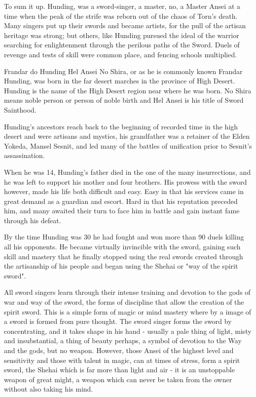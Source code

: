 To sum it up. Hunding, was a sword-singer, a master, no, a Master Ansei at a time when the peak of the strife was reborn out of the chaos of Torn's death. Many singers put up their swords and became artists, for the pull of the artisan heritage was strong; but others, like Hunding pursued the ideal of the warrior searching for enlightenment through the perilous paths of the Sword. Duels of revenge and tests of skill were common place, and fencing schools multiplied.

Frandar do Hunding Hel Ansei No Shira, or as he is commonly known Frandar Hunding, was born in the far desert marches in the province of High Desert. Hunding is the name of the High Desert region near where he was born. No Shira means noble person or person of noble birth and Hel Ansei is his title of Sword Sainthood.

Hunding's ancestors reach back to the beginning of recorded time in the high desert and were artisans and mystics, his grandfather was a retainer of the Elden Yokeda, Mansel Sesnit, and led many of the battles of unification prior to Sesnit's assassination.

When he was 14, Hunding's father died in the one of the many insurrections, and he was left to support his mother and four brothers. His prowess with the sword however, made his life both difficult and easy. Easy in that his services came in great demand as a guardian and escort. Hard in that his reputation preceded him, and many awaited their turn to face him in battle and gain instant fame through his defeat.

By the time Hunding was 30 he had fought and won more than 90 duels killing all his opponents. He became virtually invincible with the sword, gaining such skill and mastery that he finally stopped using the real swords created through the artisanship of his people and began using the Shehai or "way of the spirit sword".

All sword singers learn through their intense training and devotion to the gods of war and way of the sword, the forms of discipline that allow the creation of the spirit sword. This is a simple form of magic or mind mastery where by a image of a sword is formed from pure thought. The sword singer forms the sword by concentrating, and it takes shape in his hand - usually a pale thing of light, misty and insubstantial, a thing of beauty perhaps, a symbol of devotion to the Way and the gods, but no weapon. However, those Ansei of the highest level and sensitivity and those with talent in magic, can at times of stress, form a spirit sword, the Shehai which is far more than light and air - it is an unstoppable weapon of great might, a weapon which can never be taken from the owner without also taking his mind.

